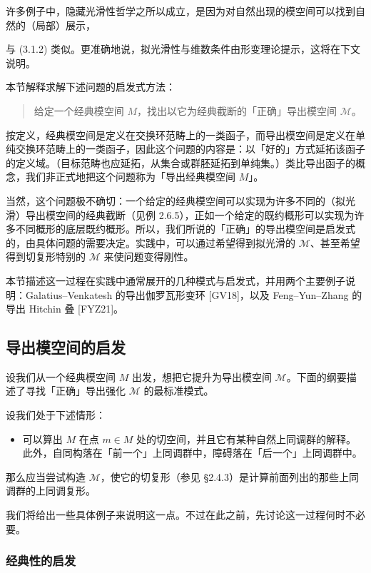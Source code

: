 许多例子中，隐藏光滑性哲学之所以成立，是因为对自然出现的模空间可以找到自然的（局部）展示，

与 (3.1.2) 类似。更准确地说，拟光滑性与维数条件由形变理论提示，这将在下文说明。

本节解释求解下述问题的启发式方法：
\begin{quote}
给定一个经典模空间 $M$，找出以它为经典截断的「正确」导出模空间 $\mathcal M$。
\end{quote}
按定义，经典模空间是定义在交换环范畴上的一类函子，而导出模空间是定义在单纯交换环范畴上的一类函子，因此这个问题的内容是：以「好的」方式延拓该函子的定义域。（目标范畴也应延拓，从集合或群胚延拓到单纯集。）类比导出函子的概念，我们非正式地把这个问题称为「导出经典模空间 $M$」。

当然，这个问题极不确切：一个给定的经典模空间可以实现为许多不同的（拟光滑）导出模空间的经典截断（见例 2.6.5），正如一个给定的既约概形可以实现为许多不同概形的底层既约概形。所以，我们所说的「正确」的导出模空间是启发式的，由具体问题的需要决定。实践中，可以通过希望得到拟光滑的 $\mathcal M$、甚至希望得到切复形特别的 $\mathcal M$ 来使问题变得刚性。

本节描述这一过程在实践中通常展开的几种模式与启发式，并用两个主要例子说明：Galatius–Venkatesh 的导出伽罗瓦形变环 [GV18]，以及 Feng–Yun–Zhang 的导出 Hitchin 叠 [FYZ21]。

\subsection{导出模空间的启发}

设我们从一个经典模空间 $M$ 出发，想把它提升为导出模空间 $\mathcal M$。下面的纲要描述了寻找「正确」导出强化 $\mathcal M$ 的最标准模式。

设我们处于下述情形：
\begin{itemize}
\item 可以算出 $M$ 在点 $m\in M$ 处的切空间，并且它有某种自然上同调群的解释。此外，自同构落在「前一个」上同调群中，障碍落在「后一个」上同调群中。
\end{itemize}
那么应当尝试构造 $\mathcal M$，使它的切复形（参见 §2.4.3）是计算前面列出的那些上同调群的上同调复形。

我们将给出一些具体例子来说明这一点。不过在此之前，先讨论这一过程何时不必要。

\subsubsection{经典性的启发}

